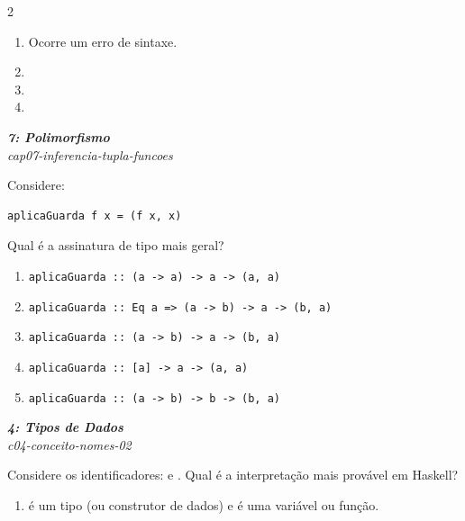 \documentclass[a4paper,10pt,brazil]{article}
\begin{document}
\begin{multicols}{2}
\begin{enumerate}
  \item Ocorre um erro de sintaxe.

  \item {}

  \item {}

  \item \haskellinline{[Char]}


\end{enumerate}

\begin{flushright}
  \footnotesize
  \textit{\textbf{7: Polimorfismo}}\\
  \textit{cap07-inferencia-tupla-funcoes}\\

\end{flushright}
Considere:

\begin{verbatim}
aplicaGuarda f x = (f x, x)
\end{verbatim}

Qual é a assinatura de tipo mais geral?

\begin{enumerate}
  \item \texttt{aplicaGuarda :: (a -> a) -> a -> (a, a)}
  \item \texttt{aplicaGuarda :: Eq a => (a -> b) -> a -> (b, a)}
  \item \texttt{aplicaGuarda :: (a -> b) -> a -> (b, a)}
  \item \texttt{aplicaGuarda :: [a] -> a -> (a, a)}
  \item \texttt{aplicaGuarda :: (a -> b) -> b -> (b, a)}

\end{enumerate}

\begin{flushright}
  \footnotesize
  \textit{\textbf{4: Tipos de Dados}}\\
  \textit{c04-conceito-nomes-02}\\

\end{flushright}
Considere os identificadores:  e . Qual é a interpretação mais provável em Haskell?

\begin{enumerate}
  \item {} é um tipo (ou construtor de dados) e  é uma variável ou função.


\end{enumerate}
\end{multicols}
\end{document}
